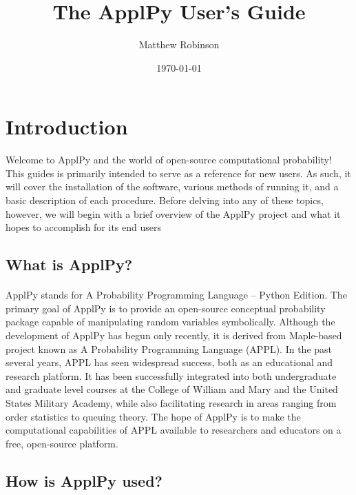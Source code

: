 \documentclass[11pt,epsfig,psfig,doublespace,singlespace]{article}
\begin{document}
\title{\bf The ApplPy User's Guide}         %
\vspace{0.4in}
\author{\begin{tabular}{cc}
  Matthew Robinson \\
\end{tabular}}
\date{\today}          %
\maketitle
\section{Introduction}
Welcome to ApplPy and the world of open-source computational probability! This guides is primarily intended to serve as a reference for new users. As such, it will cover the installation of the software, various methods of running it, and a basic description of each procedure. Before delving into any of these topics, however, we will begin with a brief overview of the ApplPy project and what it hopes to accomplish for its end users
\subsection{What is ApplPy?}
\paragraph{} ApplPy stands for A Probability Programming Language -- Python Edition. The primary goal of ApplPy is to provide an open-source conceptual probability package capable of manipulating random variables symbolically. Although the development of ApplPy has begun only recently, it is derived from Maple-based project known as A Probability Programming Language (APPL). In the past several years, APPL has seen widespread success, both as an educational and research platform. It has been successfully integrated into both undergraduate and graduate level courses at the College of William and Mary and the United States Military Academy, while also facilitating research in areas ranging from order statistics to queuing theory. The hope of ApplPy is to make the computational capabilities of APPL available to researchers and educators on a free, open-source platform.
\subsection{How is ApplPy used?}
\end{document}
